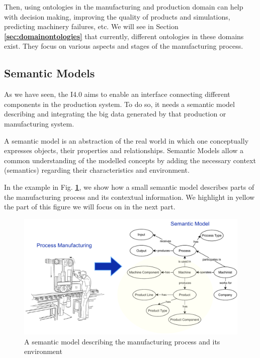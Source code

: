 \documentclass{guideline/sty/rapport}
\begin{document}
\newpage
Then, using ontologies in the manufacturing and production domain can help with decision making, improving the quality of products and simulations, predicting machinery failures, etc. We will see in Section \textbf{\ref{sec:domainontologies}} that currently, different ontologies in these domains exist. They focus on various aspects and stages of the manufacturing process.

\subsection{Semantic Models}
\label{sec:semanticmodels}
    
As we have seen, the \ac{I4.0} aims to enable an interface connecting different components in the production system. To do so, it needs a semantic model describing and integrating the big data generated by that production or manufacturing system. \singlespacing

A semantic model is an abstraction of the real world in which one conceptually expresses objects, their properties and relationships. Semantic Models allow a common understanding of the modelled concepts by adding the necessary context (semantics) regarding their characteristics and environment. \singlespacing
    
In the example in Fig. \textbf{\ref{fig:semanticmodelprocess}}, we show how a small semantic model describes parts of the manufacturing process and its contextual information. We highlight in yellow the part of this figure we will focus on in the next part. \singlespacing

\begin{figure}[htb!]
	\centering
	\includegraphics[width=1\textwidth]{images/SemanticModel.pdf}
	\caption{A semantic model describing the manufacturing process and its environment}
    \label{fig:semanticmodelprocess}
\end{figure}
\end{document}
